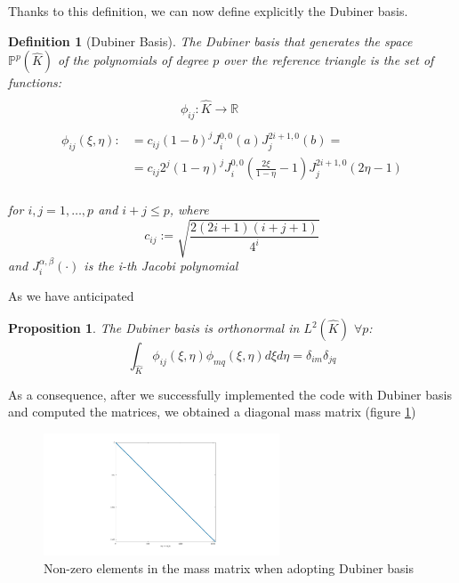 \documentclass[a4paper,11pt]{article}
\newtheorem{definition}{Definition}
\newtheorem{prop}{Proposition}
\begin{document}
    \noindent Thanks to this definition, we can now define explicitly the Dubiner basis.
    \begin{definition}[Dubiner Basis] \label{dubiner}
    The Dubiner basis that generates the space $\mathbb{P}^p(\hat{K})$ of the polynomials of degree $p$ over the reference triangle is the set of functions:
    \begin{equation}
    \begin{split}
    \\
    & \quad \quad\quad  \quad \phi_{ij}: \hat{K} \rightarrow \mathbb{R} \\ \\
    \phi_{ij}(\xi,\eta) :&= c_{ij}(1-b)^j J_i^{0,0}(a) J_j^{2i+1,0}(b)=
    \\&=c_{ij} 2^j (1-\eta)^j J_i^{0,0}(\frac{2\xi}{1-\eta}-1) J_j^{2i+1,0} (2\eta-1) 
    \end{split}
    \end{equation}
    \vspace{3mm} \\
    for $i,j=1,\dots,p$ and $i+j \le p$, where
    \begin{equation}
    c_{ij} := \sqrt{\frac{2(2i+1)(i+j+1)}{4^i}}
    \end{equation}
    and $J_i^{\alpha,\beta}(\cdot)$ is the i-th Jacobi polynomial
    \end{definition}
    
    \vspace{5mm}
    \noindent As we have anticipated
    \begin{prop}\label{l2_ortho}
    The Dubiner basis is orthonormal in $L^2(\hat{K})$ $\forall p$:
    \begin{equation}
    \int_{\hat{K}}{\phi_{ij}(\xi,\eta)\phi_{mq}(\xi,\eta) d\xi d\eta}=\delta_{im}\delta_{jq}
    \end{equation}
    \end{prop}
    \vspace{4mm}
    \noindent As a consequence, after we successfully implemented the code with Dubiner basis and computed the matrices, we obtained a diagonal mass matrix (figure \ref{mass})
    
    \begin{figure}[ht]
    \begin{center}
    \includegraphics[width = 7cm]{./mass_dubiner.jpg}
    	\caption{Non-zero elements in the mass matrix when adopting Dubiner basis}
    	\label{mass}
    \end{center}
    \end{figure}
\end{document}
